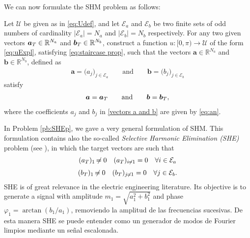 \documentclass[twocolumn]{autart}    %
\begin{document}
We can now formulate the SHM problem as follows:

\bigskip

\begin{problem}[SHM]\label{pb:SHEp}
Let $\mathcal{U}$ be given as in \eqref{eq:Udef}, and let $\mathcal{E} _a $ and $\mathcal{E} _b $ be two finite sets of odd numbers of cardinality $|\mathcal{E}_a| = N_a $ and $ |\mathcal{E} _b| = N_b$ respectively. For any two given vectors $\aT \in \mathbb{R}^{N_a}$ and $\bT \in \mathbb{R}^{N_b} $, construct a function $u: [0,\pi)\to\mathcal{U}$ of the form \eqref{eq:uExpl}, satisfying \eqref{eq:staircase prop}, such that the vectors $\bm{a} \in \mathbb{R}^{N_a}$ and $\bm{b} \in \mathbb{R}^{N_b}$, defined as
\begin{align}\label{vectors a and b}
	\bm{a} = \big( a_j \big)_{j\in \mathcal{E}_a} \qquad \text{and} \qquad
	\bm{b} = \big( b_j \big)_{j\in \mathcal{E}_b}
\end{align}
satisfy
\begin{align*} 
	\bm{a} = \aT \qquad \text{and} \qquad \bm{b} = \bT,
\end{align*}
where the coefficients $a_j$ and $b_j$ in \eqref{vectors a and b} are given by \eqref{eq:an}.
\end{problem}  
\vspace{1em}

\JOStart
\begin{remark}[SHE]\label{remark:SHE}
In Problem \ref{pb:SHEp}, we gave a very general formulation of SHM. This formulation contains also the so-called \emph{Selective Harmonic Elimination (SHE)} problem (see \cite{Sun1996}), in which the target vectors are such that 
\begin{gather}
	\notag (a_T)_1 \neq 0  \hspace{1em} (a_T)_{i\neq1} = 0 \hspace{1em} \forall i \in \mathcal{E}_a 
	\\[3pt]
	\notag (b_T)_1 \neq 0  \hspace{1em} (b_T)_{j\neq1} = 0 \hspace{1em} \forall j \in \mathcal{E}_b. 
\end{gather}
SHE is of great relevance in the electric engineering literature. Its objective is to generate a signal with amplitude $m_1 = \sqrt{a_1^2+b_1^2}$ and phase $\varphi_1=\arctan(b_1/a_1)$, removiendo la amplitud de las frecuencias sucesivas. De esta manera SHE se puede entender como un generador de  modos de Fourier limpios mediante un señal escalonada.
\end{remark}
\JOEnd
\end{document}
